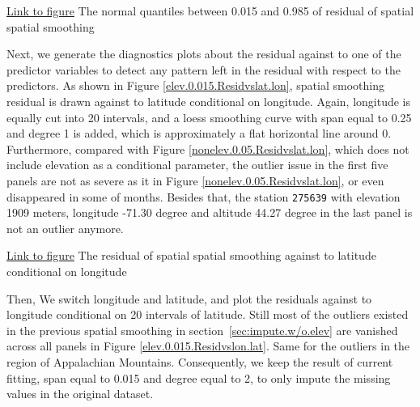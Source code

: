 \begin{framed}
\begin{center}
  \href{../plots/a1950/spaimpute/elev/d2/span0.015/a1950.spaResidcenter.bytime.pdf}
  {Link to figure}
  {The normal quantiles between 0.015 and 0.985 of residual of spatial spatial 
  smoothing}
  \label{elev2.0.015.Residcenter.bytime}
\end{center}
\end{framed}

Next, we generate the diagnostics plots about the residual against to one of the 
predictor variables to detect any pattern left in the residual with respect to
the predictors. As shown in Figure
\href{../plots/a1950/spaimpute/elev/d2/span0.015/a1950.spaResid.vs.lat.lon.pdf}
{\ref*{elev.0.015.Residvslat.lon}}, spatial smoothing residual is drawn against 
to latitude conditional on longitude. Again, longitude is equally cut into 20 
intervals, and a loess smoothing curve with span equal to 0.25 and degree 1 is
added, which is approximately a flat horizontal line around 0. Furthermore, 
compared with Figure 
\href{../plots/a1950/spaimpute/nonelev/span0.05/a1950.spaResid.vs.lat.lon.pdf}
{\ref*{nonelev.0.05.Residvslat.lon}}, which does not include elevation as a
conditional parameter, the outlier issue in the first five panels are not as 
severe as it in Figure 
\href{../plots/a1950/spaimpute/nonelev/span0.05/a1950.spaResid.vs.lat.lon.pdf}
{\ref*{nonelev.0.05.Residvslat.lon}}, or even disappeared in some of months.
Besides that, the station \texttt{275639} with elevation 1909 meters, longitude 
-71.30 degree and altitude 44.27 degree in the last panel is not an outlier 
anymore.

\begin{framed}
\begin{center}
  \href{../plots/a1950/spaimpute/elev/d2/span0.015/a1950.spaResid.vs.lat.lon.pdf}
  {Link to figure}
  {The residual of spatial spatial smoothing against to latitude conditional on 
  longitude}
  \label{elev.0.015.Residvslat.lon}
\end{center}
\end{framed}

Then, We switch longitude and latitude, and plot the residuals against to longitude
conditional on 20 intervals of latitude. Still most of the outliers existed in 
the previous spatial smoothing in section~\ref{sec:impute.w/o.elev} are vanished 
across all panels in Figure
\href{../plots/a1950/spaimpute/elev/d2/span0.015/a1950.spaResid.vs.lon.lat.pdf}
{\ref*{elev.0.015.Residvslon.lat}}. Same for the outliers in the region of 
Appalachian Mountains. Consequently, we keep the result of current fitting, span 
equal to 0.015 and degree equal to 2, to only impute the missing values in the 
original dataset.

